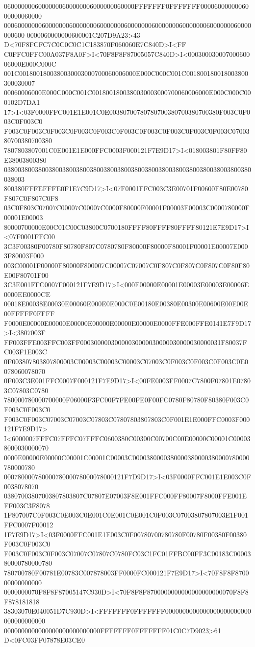 06000000060000000600000006000000060000FFFFFFF0FFFFFFF0000600000006000000060000
000600000006000000060000000600000006000000060000000600000006000000060000000600
0000060000000600001C207D9A23>43 D<70F8FCFC7C0C0C0C1C183870F060060E7C840D>I<FF
C0FFC0FFC00A037F8A0F>I<70F8F8F87005057C840D>I<00030003000700060006000E000C000C
001C0018001800380030003000700060006000E000C000C001C001800180018003800300030007
00060006000E000C000C001C0018001800380030003000700060006000E000C000C000102D7DA1
17>I<03F0000FFC001E1E001C0E00380700780780700380700380700380F003C0F003C0F003C0
F003C0F003C0F003C0F003C0F003C0F003C0F003C0F003C0F003C0F003C0700380700380700380
7807803807001C0E001E1E000FFC0003F000121F7E9D17>I<018003801F80FF80E38003800380
038003800380038003800380038003800380038003800380038003800380038003800380038003
800380FFFEFFFE0F1E7C9D17>I<07F0001FFC003C3E00701F00600F80E00780F807C0F807C0F8
03C0F803C07007C00007C00007C0000F80000F00001F00003E00003C0000780000F00001E00003
80000700000E00C01C00C03800C0700180FFFF80FFFF80FFFF80121E7E9D17>I<07F0001FFC00
3C3F00380F00780F80780F807C0780780F80000F80000F80001F00001E00007E0003F80003F000
003C00001F00000F80000F800007C00007C07007C0F807C0F807C0F807C0F80F80E00F80701F00
3C3E001FFC0007F000121F7E9D17>I<000E00000E00001E00003E00003E00006E0000EE0000CE
00018E00038E00030E00060E000E0E000C0E00180E00380E00300E00600E00E00E00FFFFF0FFFF
F0000E00000E00000E00000E00000E00000E00000E0000FFE000FFE0141E7F9D17>I<3807003F
FF003FFE003FFC003FF00030000030000030000030000030000030000031F80037FC003F1E003C
0F003807803807800003C00003C00003C00003C07003C0F003C0F003C0F003C0E0078060078070
0F003C3E001FFC0007F000121F7E9D17>I<00FE0003FF0007C7800F07801E07803C07803C0780
780000780000700000F06000F3FC00F7FE00FE0F00FC0780F80780F80380F003C0F003C0F003C0
F003C0F003C07003C07003C07803C07807803807803C0F001E1E000FFC0003F000121F7E9D17>
I<6000007FFFC07FFFC07FFFC0600380C00300C00700C00E00000C00001C000038000030000070
0000E00000E00000C00001C00001C00003C0000380000380000380000380000780000780000780
00078000078000078000078000078000121F7D9D17>I<03F0000FFC001E1E003C0F0038078070
03807003807003807803807C07807E07003F8E001FFC000FF80007F8000FFE001EFF003C3F8078
1F807007C0F003C0E003C0E001C0E001C0E001C0F003C07003807807003E1F001FFC0007F00012
1F7E9D17>I<03F0000FFC001E1E003C0F00780700780780F00780F00380F00380F003C0F003C0
F003C0F003C0F003C07007C07807C0780FC03C1FC01FFBC00FF3C00183C0000380000780000780
780700780F00781E00783C007878003FF0000FC000121F7E9D17>I<70F8F8F870000000000000
0000000070F8F8F87005147C930D>I<70F8F8F8700000000000000000000070F8F8F878181818
38303070E040051D7C930D>I<FFFFFFF0FFFFFFF0000000000000000000000000000000000000
0000000000000000000000000000FFFFFFF0FFFFFFF01C0C7D9023>61 D<0FC03FF07878E03CE0
